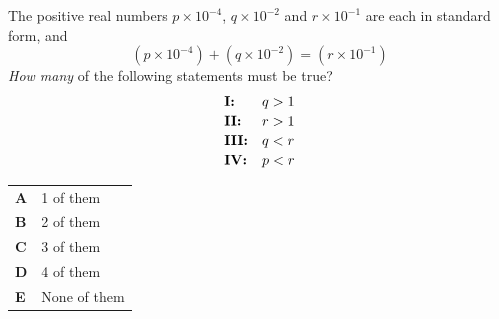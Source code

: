 \documentclass[11pt,a4paper]{article}
\begin{document}
\clearpage
\thispagestyle{djspaper}
\vspace*{8pt}
\begin{enumerate}[label=\textbf{\arabic*.},leftmargin=*,itemsep=0pt,start=12]
\questionitem[Number]
The positive real numbers $p \times 10^{-4}$, $q \times 10^{-2}$ and $r \times 10^{-1}$ are each in standard form, and \[ (p \times 10^{-4}) + (q \times 10^{-2}) = (r \times 10^{-1}) \] \textit{How many} of the following statements must be true? \[ \begin{array}{@{}l l@{}}
\textbf{I:} & \text{$q>1$} \\[2pt]
\textbf{II:} & \text{$r>1$} \\[2pt]
\textbf{III:} & \text{$q<r$} \\[2pt]
\textbf{IV:} & \text{$p<r$}
\end{array} \]

\par\vspace*{12pt}
\begin{tabularx}{\linewidth}{@{}>{\bfseries}l Y@{}}
A &
1 of them
\\[0.8em]
B &
2 of them
\\[0.8em]
C &
3 of them
\\[0.8em]
D &
4 of them
\\[0.8em]
E &
None of them
\\
\end{tabularx}
\end{enumerate}
\clearpage
\thispagestyle{djspaper}
\vspace*{8pt}
\end{document}
